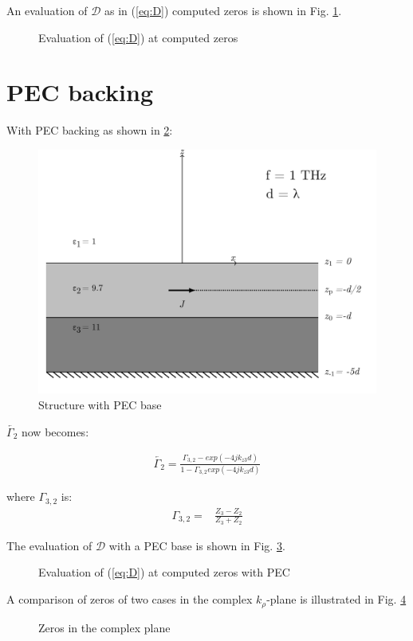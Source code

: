 \documentclass[11pt]{article}
\renewcommand{\^}{\hat}  %
\begin{document}
An evaluation of $\mathcal D$ as in (\ref{eq:D}) computed zeros is shown in Fig. \ref{fig:zeros_nopec}.

\begin{figure}[h!]
  \centering
  
  \caption{Evaluation of (\ref{eq:D}) at computed zeros}
  \label{fig:zeros_nopec}
\end{figure}

%
%
\section{PEC backing}

With PEC backing as shown in \ref{fig:structure_pec}:

\begin{figure}[h!]
  \centering
  \includegraphics[width=.85\textwidth]{structure_with_PEC_Backing}
  \caption{Structure with PEC base}
  \label{fig:structure_pec}
\end{figure}

$\overleftarrow{\Gamma_2}$ now becomes:

\begin{align}
  \overleftarrow{\Gamma_2} = \frac{{\Gamma_{3,2}} - exp(-4jk_{z3}d)}{ 1 - {\Gamma_{3,2}}exp(-4jk_{z3}d)}
  \label{eq:R_left_pec}
\end{align}

where $\Gamma_{3,2}$ is:
\begin{align}
  \Gamma_{3,2} ={}& \frac{{Z_3} - Z_2}{{Z_3} + Z_2}
  \label{eq:Gamma_32}
\end{align}

The evaluation of $\mathcal D$ with a PEC base is shown in Fig. \ref{fig:zeros_pec}.

\begin{figure}[h!]
  \centering
  
  \caption{Evaluation of (\ref{eq:D}) at computed zeros with PEC}
  \label{fig:zeros_pec}
\end{figure}

A comparison of zeros of two cases in the complex $k_{\rho}$-plane is illustrated in Fig. \ref{fig:comp}

\begin{figure}[h!]
  \centering
  
  \caption{Zeros in the complex plane}
  \label{fig:comp}
\end{figure}
\end{document}
